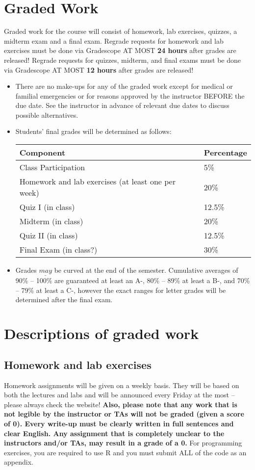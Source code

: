 \documentclass[11pt, a4paper]{article}
\begin{document}
\section{Graded Work} 
Graded work for the course will consist of homework, lab exercises, quizzes, a midterm exam and a final exam. Regrade requests for homework and lab exercises must be done via Gradescope AT MOST \textbf{24 hours} after grades are released! Regrade requests for quizzes, midterm, and final exams must be done via Gradescope AT MOST \textbf{12 hours} after grades are released!
\begin{itemize}[label= {\color{darkblue}{\ArrowBoldRightStrobe}}]
	\item There are no make-ups for any of the graded work except for medical or familial emergencies or for reasons approved by the instructor BEFORE the due date. See the instructor in advance of relevant due dates to discuss possible alternatives. 
	
	\item Students' final grades will be determined as follows:
	\begin{table}[h]
		\centering
		\begin{tabular}{ll}
			Component & Percentage \\ \hline
			Class Participation & 5\% \\
			Homework and lab exercises (at least one per week) & 20\% \\
			Quiz I (in class) & 12.5\% \\
			Midterm (in class) & 20\% \\
			Quiz II (in class) & 12.5\% \\
			Final Exam (in class?) & 30\% \\ \hline 
		\end{tabular}
	\end{table}

	\item Grades $\underline{may}$ be curved at the end of the semester. Cumulative averages of 90\% -- 100\% are guaranteed at least an A-, 80\% -- 89\% at least a B-, and 70\% -- 79\% at least a C-, however the exact ranges for letter grades will be determined after the final exam. 
\end{itemize}


\section{Descriptions of graded work}
\subsection{Homework and lab exercises}
Homework assignments will be given on a weekly basis. They will be based on both the lectures and labs and will be announced every Friday at the most – please always check the website! \textbf{Also, please note that any work that is not legible by the instructor or TAs will not be graded (given a score  of 0). Every write-up must be clearly written in full sentences and clear English. Any assignment that is completely unclear to the instructors and/or TAs, may result in a grade of a 0.} For programming exercises, you are required to use R and you must submit ALL of the code as an appendix.  
\end{document}
